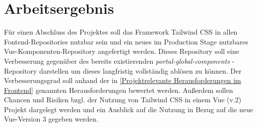 \chapter{Arbeitsergebnis}
\label{cha:Arbeitsergebnis}

Für einen Abschluss des Projektes soll das Framework Tailwind CSS in allen Fontend-Repositories nutzbar sein und ein neues im Production Stage nutzbares Vue-Komponenten-Repository angefertigt werden. Dieses Repository soll eine Verbesserung gegenüber des bereits existierenden \textit{portal-global-components} - Repository darstellen um dieses langfristig vollständig ablösen zu können. Der Verbesserungsgrad soll anhand der in \autoref{Projektrelevante Herausforderungen im Frontend} genannten Herausforderungen bewertet werden. Außerdem sollen Chancen und Risiken bzgl. der Nutzung von Tailwind CSS in einem Vue (v.2) Projekt dargelegt werden und ein Ausblick auf die Nutzung in Bezug auf die neue Vue-Version 3 gegeben werden.